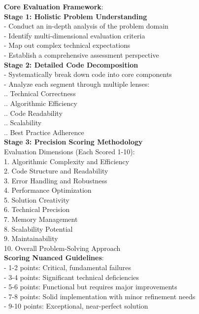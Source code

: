 \documentclass[11pt, a4paper, logo, copyright, nonumbering, amsart]{map}
\begin{document}
\begin{CJK*}{UTF8}{gbsn}
\begin{figure*}[h!]
\begin{center}
\begin{tcolorbox}[width=0.8\textwidth, colback=lightblue, title={\textbf{Advanced Critique Evaluation Prompt (with CoT)}}]
    \textbf{Core Evaluation Framework}:\\
    
    \textbf{Stage 1: Holistic Problem Understanding}\\
    - Conduct an in-depth analysis of the problem domain\\
    - Identify multi-dimensional evaluation criteria\\
    - Map out complex technical expectations\\
    - Establish a comprehensive assessment perspective\\
    
    \textbf{Stage 2: Detailed Code Decomposition}\\
    - Systematically break down code into core components\\
    - Analyze each segment through multiple lenses:\\
      .. Technical Correctness\\
      .. Algorithmic Efficiency\\
      .. Code Readability\\
      .. Scalability\\
      .. Best Practice Adherence\\
    
    \textbf{Stage 3: Precision Scoring Methodology}\\
    Evaluation Dimensions (Each Scored 1-10):\\
    1. Algorithmic Complexity and Efficiency\\
    2. Code Structure and Readability\\
    3. Error Handling and Robustness\\
    4. Performance Optimization\\
    5. Solution Creativity\\
    6. Technical Precision\\
    7. Memory Management\\
    8. Scalability Potential\\
    9. Maintainability\\
    10. Overall Problem-Solving Approach\\
    
    \textbf{Scoring Nuanced Guidelines}:\\
    - 1-2 points: Critical, fundamental failures\\
    - 3-4 points: Significant technical deficiencies\\
    - 5-6 points: Functional but requires major improvements\\
    - 7-8 points: Solid implementation with minor refinement needs\\
    - 9-10 points: Exceptional, near-perfect solution\\
    

\end{tcolorbox}
\end{center}
\end{figure*}
\end{CJK*}
\end{document}
